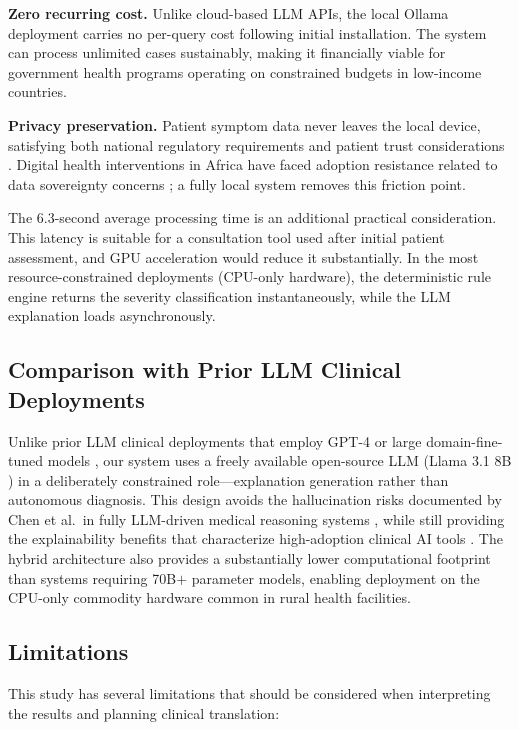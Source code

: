 \documentclass[12pt,a4paper]{article}
\begin{document}
\textbf{Zero recurring cost.} Unlike cloud-based LLM APIs, the local Ollama deployment carries no per-query cost following initial installation. The system can process unlimited cases sustainably, making it financially viable for government health programs operating on constrained budgets in low-income countries.

\textbf{Privacy preservation.} Patient symptom data never leaves the local device, satisfying both national regulatory requirements and patient trust considerations \cite{ref30}. Digital health interventions in Africa have faced adoption resistance related to data sovereignty concerns \cite{ref16}; a fully local system removes this friction point.

The 6.3-second average processing time is an additional practical consideration. This latency is suitable for a consultation tool used after initial patient assessment, and GPU acceleration would reduce it substantially. In the most resource-constrained deployments (CPU-only hardware), the deterministic rule engine returns the severity classification instantaneously, while the LLM explanation loads asynchronously.

\subsection{Comparison with Prior LLM Clinical Deployments}

Unlike prior LLM clinical deployments that employ GPT-4 \cite{ref3,ref5,ref25} or large domain-fine-tuned models \cite{ref22}, our system uses a freely available open-source LLM (Llama 3.1 8B \cite{ref9}) in a deliberately constrained role---explanation generation rather than autonomous diagnosis. This design avoids the hallucination risks documented by Chen et al.\ in fully LLM-driven medical reasoning systems \cite{ref22}, while still providing the explainability benefits that characterize high-adoption clinical AI tools \cite{ref8}. The hybrid architecture also provides a substantially lower computational footprint than systems requiring 70B$+$ parameter models, enabling deployment on the CPU-only commodity hardware common in rural health facilities.

\subsection{Limitations}

This study has several limitations that should be considered when interpreting the results and planning clinical translation:
\end{document}
